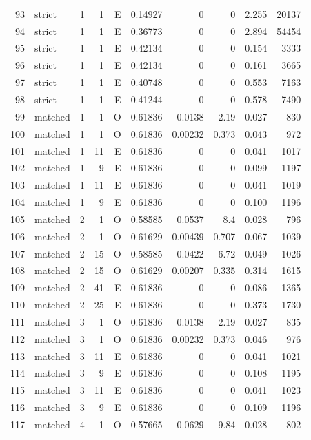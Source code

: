 \begin{longtable}{rlrrrrrrrr}
93 & strict & 1 & 1 & E & 0.14927 & 0 & 0 & 2.255 & 20137 \\
94 & strict & 1 & 1 & E & 0.36773 & 0 & 0 & 2.894 & 54454 \\
95 & strict & 1 & 1 & E & 0.42134 & 0 & 0 & 0.154 & 3333 \\
96 & strict & 1 & 1 & E & 0.42134 & 0 & 0 & 0.161 & 3665 \\
97 & strict & 1 & 1 & E & 0.40748 & 0 & 0 & 0.553 & 7163 \\
98 & strict & 1 & 1 & E & 0.41244 & 0 & 0 & 0.578 & 7490 \\
99 & matched & 1 & 1 & O & 0.61836 & 0.0138 & 2.19 & 0.027 & 830 \\
100 & matched & 1 & 1 & O & 0.61836 & 0.00232 & 0.373 & 0.043 & 972 \\
101 & matched & 1 & 11 & E & 0.61836 & 0 & 0 & 0.041 & 1017 \\
102 & matched & 1 & 9 & E & 0.61836 & 0 & 0 & 0.099 & 1197 \\
103 & matched & 1 & 11 & E & 0.61836 & 0 & 0 & 0.041 & 1019 \\
104 & matched & 1 & 9 & E & 0.61836 & 0 & 0 & 0.100 & 1196 \\
105 & matched & 2 & 1 & O & 0.58585 & 0.0537 & 8.4 & 0.028 & 796 \\
106 & matched & 2 & 1 & O & 0.61629 & 0.00439 & 0.707 & 0.067 & 1039 \\
107 & matched & 2 & 15 & O & 0.58585 & 0.0422 & 6.72 & 0.049 & 1026 \\
108 & matched & 2 & 15 & O & 0.61629 & 0.00207 & 0.335 & 0.314 & 1615 \\
109 & matched & 2 & 41 & E & 0.61836 & 0 & 0 & 0.086 & 1365 \\
110 & matched & 2 & 25 & E & 0.61836 & 0 & 0 & 0.373 & 1730 \\
111 & matched & 3 & 1 & O & 0.61836 & 0.0138 & 2.19 & 0.027 & 835 \\
112 & matched & 3 & 1 & O & 0.61836 & 0.00232 & 0.373 & 0.046 & 976 \\
113 & matched & 3 & 11 & E & 0.61836 & 0 & 0 & 0.041 & 1021 \\
114 & matched & 3 & 9 & E & 0.61836 & 0 & 0 & 0.108 & 1195 \\
115 & matched & 3 & 11 & E & 0.61836 & 0 & 0 & 0.041 & 1023 \\
116 & matched & 3 & 9 & E & 0.61836 & 0 & 0 & 0.109 & 1196 \\
117 & matched & 4 & 1 & O & 0.57665 & 0.0629 & 9.84 & 0.028 & 802 \\

\end{longtable}
